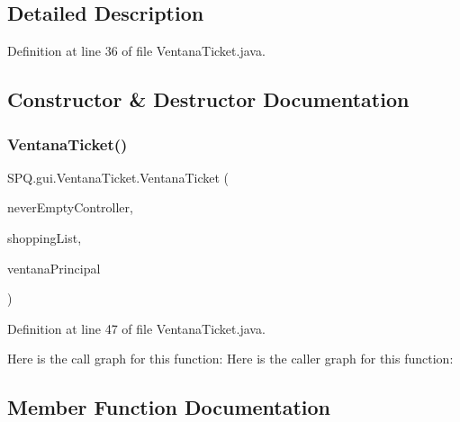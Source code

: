 \subsection{Detailed Description}


Definition at line 36 of file Ventana\+Ticket.\+java.



\subsection{Constructor \& Destructor Documentation}
\mbox{\label{class_s_p_q_1_1gui_1_1_ventana_ticket_a27ed535b91869f2e407303220482288e}} 
\subsubsection{\texorpdfstring{Ventana\+Ticket()}{VentanaTicket()}}
{\footnotesize\ttfamily S\+P\+Q.\+gui.\+Ventana\+Ticket.\+Ventana\+Ticket (\begin{DoxyParamCaption}\item[{\mbox{\hyperlink{class_s_p_q_1_1controller_1_1_never_empty_controller}{Never\+Empty\+Controller}}}]{never\+Empty\+Controller,  }\item[{List$<$ \mbox{\hyperlink{class_s_p_q_1_1gui_1_1component_1_1_product_label}{Product\+Label}} $>$}]{shopping\+List,  }\item[{\mbox{\hyperlink{class_s_p_q_1_1gui_1_1_ventana_principal}{Ventana\+Principal}}}]{ventana\+Principal }\end{DoxyParamCaption})}



Definition at line 47 of file Ventana\+Ticket.\+java.

Here is the call graph for this function\+:
Here is the caller graph for this function\+:


\subsection{Member Function Documentation}
\mbox{\label{class_s_p_q_1_1gui_1_1_ventana_ticket_ae0cea5da2b1b3819f0c934775f6c5816}} 
